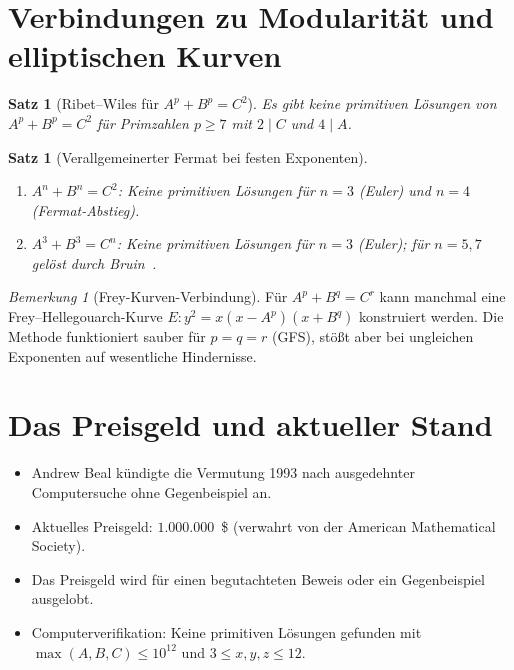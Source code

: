 \documentclass[12pt,a4paper]{amsart}
\newtheorem{satz}[theorem]{Satz}
\theoremstyle{definition}
\theoremstyle{remark}
\newtheorem{bemerkung}[theorem]{Bemerkung}
\begin{document}
\section{Verbindungen zu Modularität und elliptischen Kurven}

\begin{satz}[Ribet--Wiles für $A^p + B^p = C^2$]\label{satz:rpw}
Es gibt keine primitiven Lösungen von $A^p + B^p = C^2$ für Primzahlen $p \geq 7$
mit $2 \mid C$ und $4 \mid A$.
\end{satz}

\begin{satz}[Verallgemeinerter Fermat bei festen Exponenten]\label{satz:genFerm}
\begin{enumerate}[label=(\roman*)]
  \item $A^n + B^n = C^2$: Keine primitiven Lösungen für $n = 3$ (Euler) und
        $n = 4$ (Fermat-Abstieg).
  \item $A^3 + B^3 = C^n$: Keine primitiven Lösungen für $n = 3$ (Euler);
        für $n = 5, 7$ gelöst durch Bruin~\cite{Bruin03}.
\end{enumerate}
\end{satz}

\begin{bemerkung}[Frey-Kurven-Verbindung]
Für $A^p + B^q = C^r$ kann manchmal eine Frey--Hellegouarch-Kurve
$E\colon y^2 = x(x - A^p)(x + B^q)$ konstruiert werden.
Die Methode funktioniert sauber für $p = q = r$ (GFS), stößt aber bei ungleichen
Exponenten auf wesentliche Hindernisse.
\end{bemerkung}

\section{Das Preisgeld und aktueller Stand}

\begin{itemize}
  \item Andrew Beal kündigte die Vermutung 1993 nach ausgedehnter Computersuche
        ohne Gegenbeispiel an.
  \item Aktuelles Preisgeld: $1{.}000{.}000$~\$ (verwahrt von der American Mathematical Society).
  \item Das Preisgeld wird für einen begutachteten Beweis oder ein Gegenbeispiel ausgelobt.
  \item Computerverifikation: Keine primitiven Lösungen gefunden mit
        $\max(A,B,C) \leq 10^{12}$ und $3 \leq x,y,z \leq 12$.
\end{itemize}
\end{document}

